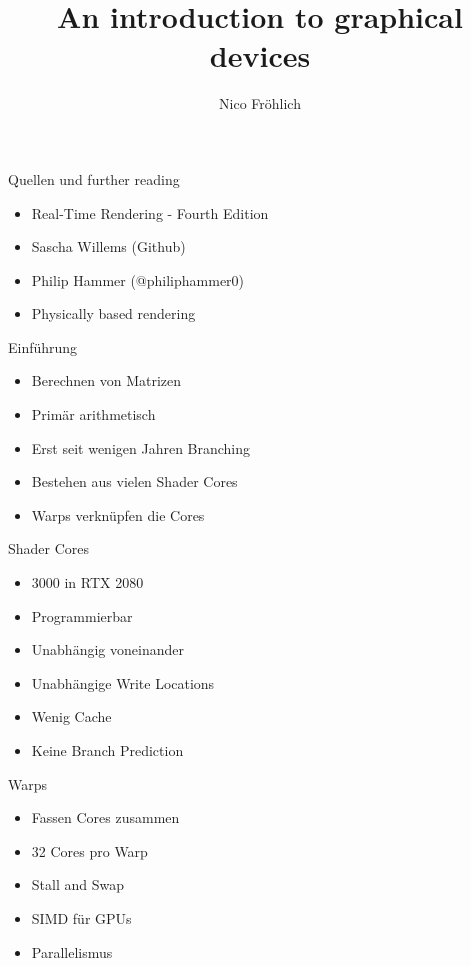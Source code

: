 \documentclass[11pt]{beamer}
\author{Nico Fröhlich}
\title{An introduction to graphical devices}
\institute{Troblecodings}
\begin{document}
\begin{frame}
    \titlepage
\end{frame}

\begin{frame}{Quellen und further reading}
    \begin{itemize}
        \item Real-Time Rendering - Fourth Edition
        \item Sascha Willems (Github)
        \item Philip Hammer (@philiphammer0)
        \item Physically based rendering
    \end{itemize}
\end{frame}

\begin{frame}{Einführung}
    \begin{itemize}
        \item Berechnen von Matrizen
        \item Primär arithmetisch
        \item Erst seit wenigen Jahren Branching
        \item Bestehen aus vielen Shader Cores
        \item Warps verknüpfen die Cores
    \end{itemize}
\end{frame}

\begin{frame}{Shader Cores}
    \begin{itemize}
        \item 3000 in RTX 2080
        \item Programmierbar
        \item Unabhängig voneinander
        \item Unabhängige Write Locations
        \item Wenig Cache
        \item Keine Branch Prediction
    \end{itemize}
\end{frame}

\begin{frame}{Warps}
    \begin{itemize}
        \item Fassen Cores zusammen
        \item 32 Cores pro Warp
        \item Stall and Swap
        \item SIMD für GPUs
        \item Parallelismus
    \end{itemize}
\end{frame}
\end{document}
